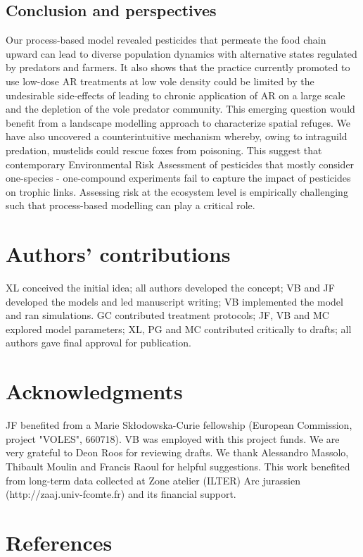 \documentclass[11pt]{article}
\begin{document}
\subsection{Conclusion and perspectives}

Our process-based model revealed pesticides that permeate the food chain upward can lead to diverse population dynamics with alternative states regulated by predators and farmers. It also shows that the practice currently promoted to use low-dose AR treatments at low vole density could be limited by the undesirable side-effects of leading to chronic application of AR on a large scale and the depletion of the vole predator community. This emerging question would benefit from a landscape modelling approach to characterize spatial refuges. We have also uncovered a counterintuitive mechanism whereby, owing to intraguild predation, mustelids could rescue foxes from poisoning. This suggest that contemporary Environmental Risk Assessment of pesticides that mostly consider one-species - one-compound experiments fail to capture the impact of pesticides on trophic links.  Assessing risk at the ecosystem level is empirically challenging such that process-based modelling can play a critical role. 

\section*{Authors’ contributions}
	
XL conceived the initial idea; all authors developed the concept; VB and JF developed the models and led manuscript writing; VB implemented the model and ran simulations. GC contributed treatment protocols; JF, VB and MC explored model parameters; XL, PG and MC contributed critically to drafts; all authors gave final approval for publication.


\section*{Acknowledgments}

JF benefited from a Marie Skłodowska-Curie fellowship (European Commission, project "VOLES", 660718). VB was employed with this project funds. We are very grateful to Deon Roos for reviewing drafts. We thank Alessandro Massolo, Thibault Moulin and Francis Raoul for helpful suggestions. This work benefited from long-term data collected at Zone atelier (ILTER) Arc jurassien (http://zaaj.univ-fcomte.fr) and its financial support.



\section*{References}

%

%

\end{document}

